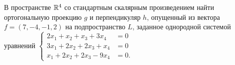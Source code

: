 \documentclass[addpoints, answers]{exam} %
\begin{document}
\begin{questions}
\question[10] В пространстве $\mathbb R^4$ со стандартным скалярным произведением найти ортогональную проекцию $g$ и перпендикуляр $h$, опущенный из вектора $f=(7,-4,-1,2)$ на подпространство $L$, заданное однородной системой уравнений
$\left\{\begin{aligned}
2x_1+x_2+x_3+3x_4 &=0\\
3x_1+2x_2+2x_3+x_4 &=0\\
x_1+2x_2+2x_3-9x_4 &=0.
\end{aligned}\right.$\\


\end{questions}
\end{document}
